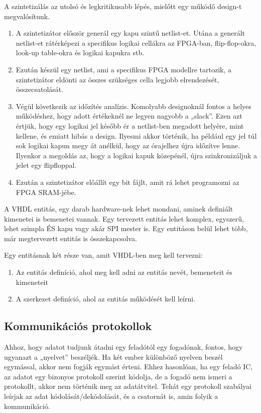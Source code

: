 \documentclass[a4paper,12pt,oneside]{book}
\begin{document}
A szintetizálás az utolsó és legkritikusabb lépés, mielőtt egy működő design-t megvalósítunk. 
\begin{enumerate}
	\item A szintetizátor először generál egy kapu szintű netlist-et. Utána a generált netlist-et rátérképezi a specifikus logikai cellákra az FPGA-ban, flip-flop-okra, look-up table-okra és logikai kapukra stb. 
	\item Ezután készül egy netlist, ami a specifikus FPGA modellre tartozik, a szintetizátor eldönti az összes szükséges cella legjobb elrendezését, összecsatolását. 
	\item Végül következik az időzítés analízis. Komolyabb designoknál fontos a helyes működéshez, hogy adott értékeknél ne legyen nagyobb a „slack”. Ezen azt értjük, hogy egy logikai jel később ér a netlist-ben megadott helyére, mint kellene, és emiatt hibás a design. Ilyesmi akkor történik, ha például egy jel túl sok logikai kapun megy át anélkül, hogy az órajelhez újra időzítve lenne. Ilyenkor a megoldás az, hogy a logikai kapuk közepénél, újra szinkronizáljuk a jelet egy flipfloppal.
	\item Ezután a szintetizátor előállít egy bit fájlt, amit rá lehet programozni az FPGA SRAM-jébe.  
\end{enumerate}
A VHDL entitás, egy darab hardware-nek lehet mondani, aminek definiált kimenetei is bemenetei vannak. Egy tervezett entitás lehet komplex, egyszerű, lehet szimpla ÉS kapu vagy akár SPI mester is. Egy entitáson belül lehet több, már megtervezett entitás is összekapcsolva. 

Egy entitásnak két része van, amit VHDL-ben meg kell tervezni: 
\begin{enumerate}
	\item Az entitás definíció, ahol meg kell adni az entitás nevét, bemeneteit és kimeneteit
	\item A szerkezet definíció, ahol az entitás működését kell leírni. 	  
\end{enumerate}

\subsection{Kommunikációs protokollok}
Ahhoz, hogy adatot tudjunk átadni egy feladótól egy fogadónak, fontos, hogy ugyanazt a „nyelvet” beszéljék. Ha két ember különböző nyelven beszél egymással, akkor nem fogják egymást érteni. Ehhez hasonlóan, ha egy feladó IC, az adatot egy bizonyos protokoll szerint kódolja, de a fogadó nem ismeri a protokollt, akkor nem történik meg az adatátvitel. Tehát egy protokoll szabályai leírjak az adat kódolását/dekódolását, és a csatornát is, amin folyik a kommunikáció. 
\end{document}
